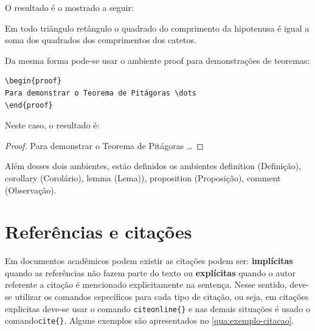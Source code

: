 O resultado é o mostrado a seguir:

\begin{theorem}[Pitágoras]
Em todo triângulo retângulo o quadrado do comprimento da hipotenusa é igual a soma dos quadrados dos comprimentos dos catetos.
\end{theorem}

Da mesma forma pode-se usar o ambiente \textsf{proof} para demonstrações de teoremas:
\begin{verbatim}
\begin{proof}
Para demonstrar o Teorema de Pitágoras \dots
\end{proof}
\end{verbatim}

Neste caso, o resultado é:
\begin{proof}
Para demonstrar o Teorema de Pitágoras \dots
\end{proof}

Além desses dois ambientes, estão definidos os ambientes \textsf{definition} (Definição), \textsf{corollary} (Corolário), \textsf{lemma} (Lema)), \textsf{proposition} (Proposição), \textsf{comment} (Observação).

\section{Referências e citações}

Em documentos acadêmicos podem existir as citações podem ser: \textbf{implícitas} quando as referências não fazem parte do texto ou \textbf{explícitas} quando o autor referente a citação é mencionado explicitamente na sentença. Nesse sentido, deve-se utilizar os comandos específicos para cada tipo de citação, ou seja, em citações explicitas deve-se usar o comando \verb|citeonline{}| e nas demais situações é usado o comando\verb|cite{}|. Alguns exemplos são apresentados no \autoref{qua:exemplo-citacao}.

